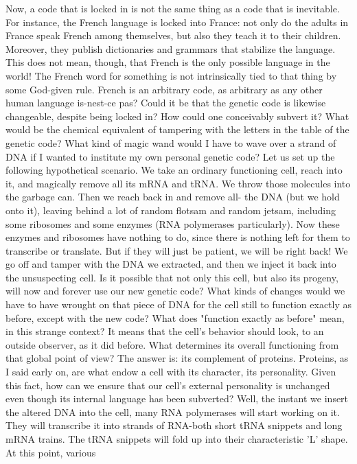         Now, a code that is locked in is not the same thing as a code that is inevitable.
For instance, the French language is locked into France: not only do the adults in
France speak French among themselves, but also they teach it to their children.
Moreover, they publish dictionaries and grammars that stabilize the language. This
does not mean, though, that French is the only possible language in the world! The
French word for something is not intrinsically tied to that thing by some God-given
rule. French is an arbitrary code, as arbitrary as any other human language is-nest-ce
pas?
        Could it be that the genetic code is likewise changeable, despite being locked
in? How could one conceivably subvert it? What would be the chemical equivalent of
tampering with the letters in the table of the genetic code? What kind of magic wand
would I have to wave over a strand of DNA if I wanted to institute my own personal
genetic code?
        Let us set up the following hypothetical scenario. We take an ordinary
functioning cell, reach into it, and magically remove all its mRNA and tRNA. We
throw those molecules into the garbage can. Then we reach back in and remove all-
the DNA (but we hold onto it), leaving behind a lot of random flotsam and random
jetsam, including some ribosomes and some enzymes (RNA polymerases
particularly). Now these enzymes and ribosomes have nothing to do, since there is
nothing left for them to transcribe or translate. But if they will just be patient, we will
be right back! We go off and tamper with the DNA we extracted, and then we inject it
back into the unsuspecting cell. Is it possible that not only this cell, but also its
progeny, will now and forever use our new genetic code? What kinds of changes
would we have to have wrought on that piece of DNA for the cell still to function
exactly as before, except with the new code?
        What does "function exactly as before" mean, in this strange context? It means
that the cell's behavior should look, to an outside observer, as it did before. What
determines its overall functioning from that global point of view? The answer is: its
complement of proteins. Proteins, as I said early on, are what endow a cell with its
character, its personality. Given this fact, how can we ensure that our cell's external
personality is unchanged even though its internal language has been subverted?
Well, the instant we insert the altered DNA into the cell, many RNA polymerases will
start working on it. They will transcribe it into strands of RNA-both short tRNA
snippets and long mRNA trains. The tRNA snippets will fold up into their
characteristic 'L' shape. At this point, various




